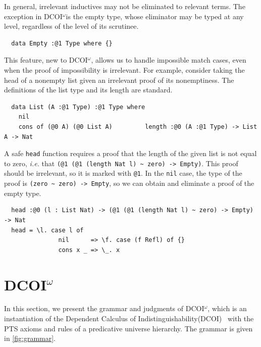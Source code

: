 \documentclass[acmsmall, screen=true, nonacm=true,
  review=\ifpublic false\else true\fi,
  anonymous=\ifanonymous true\else false\fi
]{acmart}
\makeatletter
\newcommand{\dcoi}{DCOI\@\xspace}
\newcommand{\name}{\texorpdfstring{DCOI$^{\omega}$\@\xspace}{DCOI-omega}}
\newcommand{\longname}{Dependent Calculus of Indistinguishability\@\xspace}
\makeatother
\begin{document}
In general, irrelevant inductives may not be eliminated to relevant terms.
The exception in \name is the empty type,
whose eliminator may be typed at any level,
regardless of the level of its scrutinee.
\begin{lstlisting}
  data Empty :@1 Type where {}
\end{lstlisting}
\noindent
This feature, new to \name, allows us to handle impossible match cases,
even when the proof of impossibility is irrelevant.
For example, consider taking the head of a nonempty list 
given an irrelevant proof of its nonemptiness. The definitions of the 
list type and its length are standard.

\begin{lstlisting}
  data List (A :@1 Type) :@1 Type where
    nil
    cons of (@0 A) (@0 List A)         length :@0 (A :@1 Type) -> List A -> Nat
\end{lstlisting}

A safe \lstinline{head} function requires a proof
that the length of the given list is not equal to zero, \emph{i.e.} that 
\lstinline{(@1 (@1 (length Nat l) ~ zero) -> Empty)}. This proof 
should be irrelevant, so it is marked with \lstinline{@1}.
In the \lstinline{nil} case, the type of the proof is
\lstinline{(zero ~ zero) -> Empty},
so we can obtain and eliminate a proof of the empty type.

\begin{lstlisting}
  head :@0 (l : List Nat) -> (@1 (@1 (length Nat l) ~ zero) -> Empty) -> Nat
  head = \l. case l of
               nil      => \f. case (f Refl) of {}
               cons x _ => \_. x
\end{lstlisting}

\section{\name}

In this section, we present the grammar and judgments of \name,
which is an instantiation of the \longname (\dcoi)~\citep{liu:dcoi} with
the PTS axioms and rules of a predicative universe hierarchy.
The grammar is given in \cref{fig:grammar}.
\end{document}
